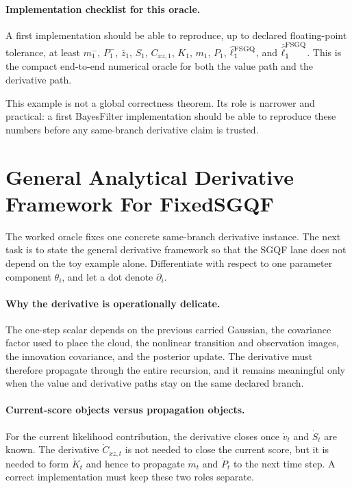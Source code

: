 \paragraph{Implementation checklist for this oracle.}
A first implementation should be able to reproduce, up to declared floating-point
tolerance, at least
\(m_1^-\), \(P_1^-\), \(\bar z_1\), \(S_1\), \(C_{xz,1}\), \(K_1\),
\(m_1\), \(P_1\), \(\widehat\ell_1^{\rm FSGQ}\), and
\(\dot{\widehat\ell}_1^{\rm FSGQ}\).  This is the compact end-to-end numerical
oracle for both the value path and the derivative path.

This example is not a global correctness theorem.  Its role is narrower and
practical: a first BayesFilter implementation should be able to reproduce these
numbers before any same-branch derivative claim is trusted.

\section{General Analytical Derivative Framework For FixedSGQF}
\label{sec:bf-hd-sgqf-general-derivative}

The worked oracle fixes one concrete same-branch derivative instance.  The next
task is to state the general derivative framework so that the SGQF lane does not
depend on the toy example alone.  Differentiate with respect to one parameter
component \(\theta_i\), and let a dot denote \(\partial_i\).

\paragraph{Why the derivative is operationally delicate.}
The one-step scalar depends on the previous carried Gaussian, the covariance
factor used to place the cloud, the nonlinear transition and observation images,
the innovation covariance, and the posterior update.  The derivative must
therefore propagate through the entire recursion, and it remains meaningful only
when the value and derivative paths stay on the same declared branch.

\paragraph{Current-score objects versus propagation objects.}
For the current likelihood contribution, the derivative closes once
\(\dot v_t\) and \(\dot S_t\) are known.  The derivative
\(\dot C_{xz,t}\) is not needed to close the current score, but it is needed to
form \(\dot K_t\) and hence to propagate \(\dot m_t\) and \(\dot P_t\) to the
next time step.  A correct implementation must keep these two roles separate.

